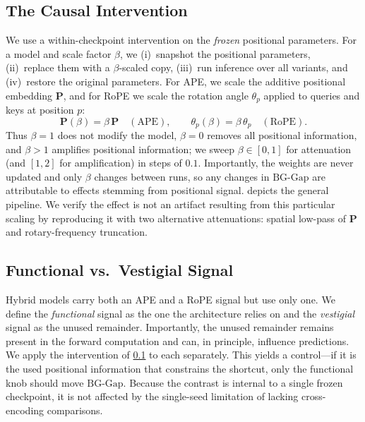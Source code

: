 \documentclass[10pt,twocolumn,letterpaper]{article}
\begin{document}
\subsection{The Causal Intervention}
\label{sec:intervention}
We use a within-checkpoint intervention on the \emph{frozen} positional parameters. For a model and scale factor $\beta$, we (i)~snapshot the positional parameters, (ii)~replace them with a $\beta$-scaled copy, (iii)~run inference over all variants, and (iv)~restore the original parameters. For APE, we scale the additive positional embedding $\mathbf{P}$, and for RoPE we scale the rotation angle $\theta_p$ applied to queries and keys at position $p$:
%
\begin{equation}
  \mathbf{P}(\beta)=\beta\,\mathbf{P}\quad(\text{APE}),
  \qquad
  \theta_p(\beta)=\beta\,\theta_p\quad(\text{RoPE}).
  \label{eq:intervention}
\end{equation}
%
Thus $\beta{=}1$ does not modify the model, $\beta{=}0$ removes all positional information, and $\beta{>}1$ amplifies positional information; we sweep $\beta\in[0,1]$ for attenuation (and $[1,2]$ for amplification) in steps of $0.1$. Importantly, the weights are never updated and only $\beta$ changes between runs, so any changes in $\mathrm{BG\text{-}Gap}$ are attributable to effects stemming from positional signal.  depicts the general pipeline. We verify the effect is not an artifact resulting from this particular scaling by reproducing it with two alternative attenuations: spatial low-pass of $\mathbf{P}$ and rotary-frequency truncation.

\subsection{Functional vs.\ Vestigial Signal}
\label{sec:funcvest}
Hybrid models carry both an APE and a RoPE signal but use only one. We define the \emph{functional} signal as the one the architecture relies on and the \emph{vestigial} signal as the unused remainder. Importantly, the unused remainder remains present in the forward computation and can, in principle, influence predictions. We apply the intervention of \cref{sec:intervention} to each separately. This yields a control---if it is the used positional information that constrains the shortcut, only the functional knob should move $\mathrm{BG\text{-}Gap}$. Because the contrast is internal to a single frozen checkpoint, it is not affected by the single-seed limitation of lacking cross-encoding comparisons.
\end{document}
